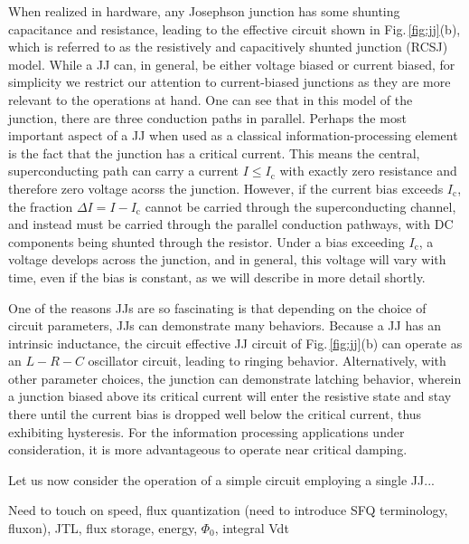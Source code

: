 \documentclass[twocolumn]{article}
\begin{document}
When realized in hardware, any Josephson junction has some shunting capacitance and resistance, leading to the effective circuit shown in Fig.\,\ref{fig:jj}(b), which is referred to as the resistively and capacitively shunted junction (RCSJ) model. While a JJ can, in general, be either voltage biased or current biased, for simplicity we restrict our attention to current-biased junctions as they are more relevant to the operations at hand. One can see that in this model of the junction, there are three conduction paths in parallel. Perhaps the most important aspect of a JJ when used as a classical information-processing element is the fact that the junction has a critical current. This means the central, superconducting path can carry a current $I\le I_{\mathrm{c}}$ with exactly zero resistance and therefore zero voltage acorss the junction. However, if the current bias exceeds $I_{\mathrm{c}}$, the fraction $\Delta I = I-I_{\mathrm{c}}$ cannot be carried through the superconducting channel, and instead must be carried through the parallel conduction pathways, with DC components being shunted through the resistor. Under a bias exceeding $I_{\mathrm{c}}$, a voltage develops across the junction, and in general, this voltage will vary with time, even if the bias is constant, as we will describe in more detail shortly. 

One of the reasons JJs are so fascinating is that depending on the choice of circuit parameters, JJs can demonstrate many behaviors. Because a JJ has an intrinsic inductance, the circuit effective JJ circuit of Fig.\,\ref{fig:jj}(b) can operate as an $L-R-C$ oscillator circuit, leading to ringing behavior. Alternatively, with other parameter choices, the junction can demonstrate latching behavior, wherein a junction biased above its critical current will enter the resistive state and stay there until the current bias is dropped well below the critical current, thus exhibiting hysteresis. For the information processing applications under consideration, it is more advantageous to operate near critical damping.

Let us now consider the operation of a simple circuit employing a single JJ...

Need to touch on speed, flux quantization (need to introduce SFQ terminology, fluxon), JTL, flux storage, energy, $\Phi_0$, integral Vdt
\end{document}
